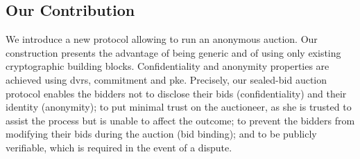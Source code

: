 

\subsection{Our Contribution}%
\label{subsec-contr}%
We introduce a new protocol allowing to run an anonymous auction. Our construction presents the advantage of being generic and of using only existing cryptographic building blocks. Confidentiality and anonymity properties are achieved using \gls{dvrs}, commitment and \gls{pke}. Precisely, our sealed-bid auction protocol enables the bidders not to disclose their bids (confidentiality) and their identity (anonymity); to put minimal trust on the auctioneer, as she is trusted to assist the process but is unable to affect the outcome; to prevent the bidders from modifying their bids during the auction (bid binding); and to be publicly verifiable, which is required in the event of a dispute.


